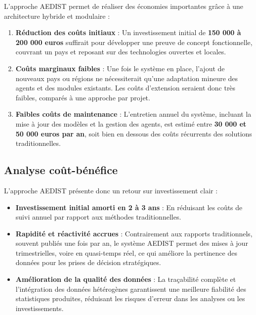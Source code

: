 \documentclass[a4paper,11pt]{report}
\providecommand{\tightlist}{\setlength{\itemsep}{0pt}\setlength{\parskip}{0pt}}
\begin{document}
L'approche AEDIST permet de réaliser des économies importantes grâce à une architecture hybride et modulaire :

\begin{enumerate}
\def\labelenumi{\arabic{enumi}.}
\tightlist
\item
  \textbf{Réduction des coûts initiaux} : Un investissement initial de \textbf{150 000 à 200 000 euros} suffirait pour développer une preuve de concept fonctionnelle, couvrant un pays et reposant sur des technologies ouvertes et locales.
\item
  \textbf{Coûts marginaux faibles} : Une fois le système en place, l'ajout de nouveaux pays ou régions ne nécessiterait qu'une adaptation mineure des agents et des modules existants. Les coûts d'extension seraient donc très faibles, comparés à une approche par projet.
\item
  \textbf{Faibles coûts de maintenance} : L'entretien annuel du système, incluant la mise à jour des modèles et la gestion des agents, est estimé entre \textbf{30 000 et 50 000 euros par an}, soit bien en dessous des coûts récurrents des solutions traditionnelles.
\end{enumerate}

\subsection{Analyse coût-bénéfice}\label{analyse-couxfbt-buxe9nuxe9fice}

L'approche AEDIST présente donc un retour sur investissement clair :

\begin{itemize}
\tightlist
\item
  \textbf{Investissement initial amorti en 2 à 3 ans} : En réduisant les coûts de suivi annuel par rapport aux méthodes traditionnelles.
\item
  \textbf{Rapidité et réactivité accrues} : Contrairement aux rapports traditionnels, souvent publiés une fois par an, le système AEDIST permet des mises à jour trimestrielles, voire en quasi-temps réel, ce qui améliore la pertinence des données pour les prises de décision stratégiques.
\item
  \textbf{Amélioration de la qualité des données} : La traçabilité complète et l'intégration des données hétérogènes garantissent une meilleure fiabilité des statistiques produites, réduisant les risques d'erreur dans les analyses ou les investissements.
\end{itemize}
\end{document}
